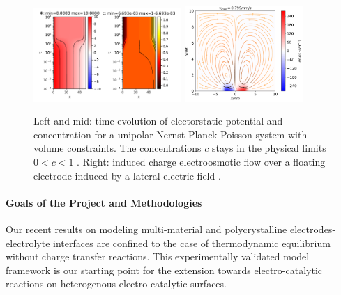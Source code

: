 \documentclass[a4paper,10pt]{article}
\begin{document}
\begin{figure}
  \centering
  \includegraphics[width=0.5\textwidth]{ccfg.pdf}
  \includegraphics[width=0.4\textwidth]{iceo.pdf}
   \caption{Left and mid: time evolution of electorstatic potential and concentration for
  a unipolar Nernst-Planck-Poisson system with volume constraints. The concentrations $c$
  stays in the physical limits $0<c<1$ \cite{CCFG2020}.
  Right: induced charge electroosmotic flow over a floating electrode induced by a lateral
  electric field \cite{FuhrmannEtAlECActa2019}. \label{fig:fv}}
\end{figure}


\paragraph{Goals of the Project and Methodologies}

Our recent results on modeling multi-material and polycrystalline electrodes-electrolyte interfaces are confined to the case of thermodynamic equilibrium without charge transfer reactions. This experimentally validated model framework is our starting point for the extension towards electro-catalytic reactions on heterogenous electro-catalytic surfaces.  

\end{document}
